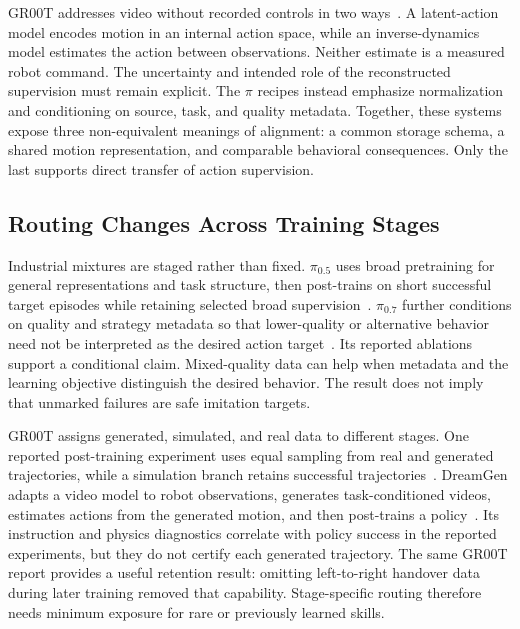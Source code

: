 GR00T addresses video without recorded controls in two ways~\cite{nvidia2025gr00t_2503_14734}. A latent-action model encodes motion in an internal action space, while an inverse-dynamics model estimates the action between observations. Neither estimate is a measured robot command. The uncertainty and intended role of the reconstructed supervision must remain explicit. The $\pi$ recipes instead emphasize normalization and conditioning on source, task, and quality metadata. Together, these systems expose three non-equivalent meanings of alignment: a common storage schema, a shared motion representation, and comparable behavioral consequences. Only the last supports direct transfer of action supervision.

\subsection{Routing Changes Across Training Stages}

Industrial mixtures are staged rather than fixed. $\pi_{0.5}$ uses broad pretraining for general representations and task structure, then post-trains on short successful target episodes while retaining selected broad supervision~\cite{intelligence20250_2504_16054}. $\pi_{0.7}$ further conditions on quality and strategy metadata so that lower-quality or alternative behavior need not be interpreted as the desired action target~\cite{intelligence20260_2604_15483}. Its reported ablations support a conditional claim. Mixed-quality data can help when metadata and the learning objective distinguish the desired behavior. The result does not imply that unmarked failures are safe imitation targets.

GR00T assigns generated, simulated, and real data to different stages. One reported post-training experiment uses equal sampling from real and generated trajectories, while a simulation branch retains successful trajectories~\cite{nvidia2025gr00t_2503_14734}. DreamGen adapts a video model to robot observations, generates task-conditioned videos, estimates actions from the generated motion, and then post-trains a policy~\cite{jang2025dreamgen_2505_12705}. Its instruction and physics diagnostics correlate with policy success in the reported experiments, but they do not certify each generated trajectory. The same GR00T report provides a useful retention result: omitting left-to-right handover data during later training removed that capability. Stage-specific routing therefore needs minimum exposure for rare or previously learned skills.

